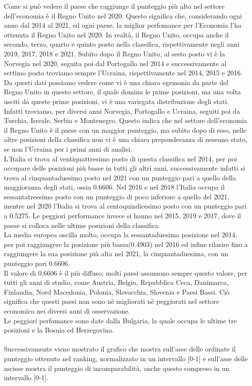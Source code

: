 \documentclass[a4paper,12pt, openright]{report}
\begin{document}
Come si può vedere il paese che raggiunge il punteggio più alto nel settore dell'economia è il Regno Unito nel 2020. Questo significa che, considerando ogni 
anno dal 2014 al 2021, 
ed ogni paese, la miglior perfomance per l'Economia l'ha ottenuta il Regno Unito nel 2020. In realtà, il Regno Unito, occupa anche il secondo, terzo, quarto e quinto posto
nella classifica, rispettivamente negli anni 2019, 2017, 2018 e 2021. Subito dopo il Regno Unito, al sesto posto vi è la Norvegia nel 2020, seguita poi dal Portogallo nel 2014
e successivamente al settimo posto troviamo sempre l'Ucraina, rispettivamente nel 2014, 2015 e 2016. Da questi dati possiamo vedere come vi
è una chiara egemonia 
da parte del Regno Unito in questo settore, il quale domina le prime posizioni, ma una volta usciti da queste prime posizioni, vi è una variegata distribuzione degli stati. Infatti 
troviamo, per diversi anni Norvegia, Portogallo e Ucraina, seguiti poi da Turchia, Isreale, Serbia e Montenegro. Questo indica che nel settore dell'economia il Regno Unito
è il paese con un maggior punteggio, ma subito dopo di esso, nelle altre posizioni della classifica non vi è una chiara preponderanza di nessuno stato, se non l'Ucraina 
per i primi anni di analisi. \\
L'Italia si trova al ventiquattresimo posto di questa classifica nel 2014, per poi occupare delle posizioni più basse in tutti gli altri anni, successivamente infatti
si trova al cinquantaduesimo posto nel 2021 con un punteggio pari a quello della maggioranza degli stati, 
ossia 0.6606. Nel 2016 e nel 2018 l'Italia occupa il sessantatreesimo posto con un punteggio di poco inferiore a 
quello del 2021, mentre nel 2020 l'Italia si trova al centoquindicesimo posto con un punteggio pari a 0.5275.
Le peggiori performance invece si hanno nel 2015, 2019 e 2017, dove il paese
si colloca nelle ultime posizioni della classifica. \\
La media europea oscilla molto, occupa la sessantaduesima posizione nel 2014, per poi raggiungere la posizione più bassa(0.4903) nel 2016 ed infine rilasire
fino a raggiungere la sua posizione più alta nel 2021, la cinquantaduesima, con un punteggio pari 0.6606. \\
Il valore di 0.6606 è il più diffuso; molti paesi assumono sempre questo valore, per tutti gli anni di studio, come Austria, Belgio, Repubblica Ceca, Danimarca, 
Finlandia, Nord Macedonia, Polonia, Slovacchia, Slovenia e Paesi Bassi. Ciò significa che questi paesi non sono nè migliorati nè peggiorati
nel settore economico nei diversi anni di osservazione. \\
Le peggiori perfomance sono date dalla Bulgaria, la quale occupa le ultime tre posizioni e la Bosnia ed Herzegovina. 
\\
\\
Successivamente viene mostrato il grafico che mostra sull'asse delle ordinate il punteggio ottenuto nel ranking, normalizzato in un intervallo [0-1] e sull'asse delle ascisse 
mostra il punteggio di incomparabilità, anche questo compreso in un intervallo [0-1]. 
\end{document}

